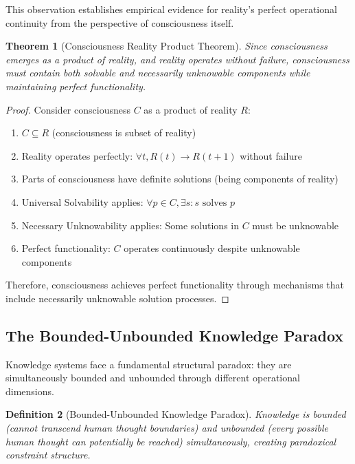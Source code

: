\documentclass[12pt,a4paper]{article}
\newtheorem{theorem}{Theorem}[section]
\newtheorem{definition}[theorem]{Definition}
\begin{document}
This observation establishes empirical evidence for reality's perfect operational continuity from the perspective of consciousness itself.

\begin{theorem}[Consciousness Reality Product Theorem]
Since consciousness emerges as a product of reality, and reality operates without failure, consciousness must contain both solvable and necessarily unknowable components while maintaining perfect functionality.
\end{theorem}

\begin{proof}
Consider consciousness $C$ as a product of reality $R$:
\begin{enumerate}
\item $C \subseteq R$ (consciousness is subset of reality)
\item Reality operates perfectly: $\forall t, R(t) \rightarrow R(t+1)$ without failure
\item Parts of consciousness have definite solutions (being components of reality)
\item Universal Solvability applies: $\forall p \in C, \exists s : s \text{ solves } p$
\item Necessary Unknowability applies: Some solutions in $C$ must be unknowable
\item Perfect functionality: $C$ operates continuously despite unknowable components
\end{enumerate}

Therefore, consciousness achieves perfect functionality through mechanisms that include necessarily unknowable solution processes.
\end{proof}

\subsection{The Bounded-Unbounded Knowledge Paradox}

Knowledge systems face a fundamental structural paradox: they are simultaneously bounded and unbounded through different operational dimensions.

\begin{definition}[Bounded-Unbounded Knowledge Paradox]
Knowledge is bounded (cannot transcend human thought boundaries) and unbounded (every possible human thought can potentially be reached) simultaneously, creating paradoxical constraint structure.
\end{definition}
\end{document}
